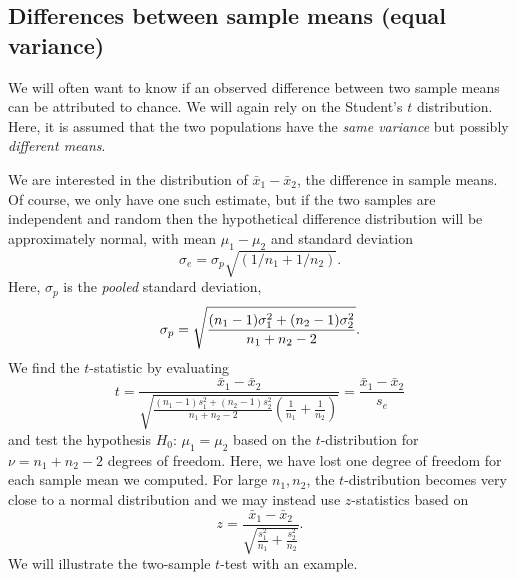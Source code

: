 \subsection{Differences between sample means (equal variance)}
\label{sec:twomeans}
	We will often want to know if an observed difference between two sample means can be attributed to 
chance.  We will again rely on the Student's $t$ distribution.  Here, it is assumed that the two populations
have the \emph{same variance} but possibly \emph{different means}.  

	We are interested in the distribution of $\bar{x}_1 - \bar{x}_2$, the difference in sample means.
Of course, we only have one such estimate, but if the two
samples are independent and random then the hypothetical difference distribution will be approximately normal,
with mean  $\mu_1 - \mu_2$  and standard deviation
\begin{equation}
\sigma_e = \sigma_p \sqrt{ (1/n_1 + 1/n_2)}.
\end{equation}
Here, $\sigma_p$ is the \emph{pooled} standard deviation,
\begin{equation}
	\index{Pooled standard deviation}
	\index{Standard deviation!pooled}
\sigma_p = \sqrt{ \frac{(n_1 - 1 ) \sigma^2_1 + (n_2 - 1) \sigma^2_2}{n_1 + n_2 - 2}     }.	 
\end{equation}
We find the $t$-statistic by evaluating
\begin{equation}
t = \frac {\bar{x}_1 - \bar{x}_2} { \sqrt{ \frac{ (n_1 - 1) s^2_1 + (n_2 - 1) s^2_2 }
{n_1 + n_2 -2} \left( \frac{1}{n_1} + \frac{1}{n_2} \right)  }  } = \frac{\bar{x}_1 - \bar{x}_2}{s_e}
\label{eq:t_two_means}
\end{equation}
and test the hypothesis $H_0$: $\mu_1 = \mu_2$  based on the $t$-distribution for  $\nu = n_1 + n_2 - 2$ degrees of 
freedom.  Here, we have lost one degree of freedom for each sample mean we computed.
For large $n_1, n_2$, the $t$-distribution becomes very close to a normal distribution and we 
may instead use $z$-statistics based on
\begin{equation}
z = \frac{\bar{x}_1 - \bar{x}_2} { \sqrt{ \frac{s^2_1} {n_1} + \frac{s^2_2}{n_2} }}.
\label{eq:twosamplez}
\end{equation}
We will illustrate the two-sample $t$-test with an example.
